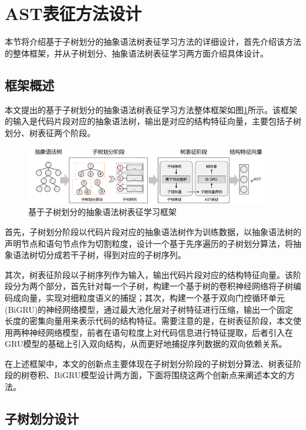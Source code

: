\section{AST表征方法设计}
\label{sec:AST}
本节将介绍基于子树划分的抽象语法树表征学习方法的详细设计，首先介绍该方法的整体框架，并从子树划分、抽象语法树表征学习两方面介绍具体设计。 

\subsection{框架概述}
\label{subsec:ASTOverview}
本文提出的基于子树划分的抽象语法树表征学习方法整体框架如图\ref{fig:astframework}所示。该框架的输入是代码片段对应的抽象语法树，输出是对应的结构特征向量，主要包括子树划分、树表征两个阶段。

\begin{figure}[H]
  \centering
  \includegraphics[width=0.95\textwidth]{figures/astframework.png}
  \caption{基于子树划分的抽象语法树表征学习框架}\label{fig:astframework}
\end{figure}

首先，子树划分阶段以代码片段对应的抽象语法树作为训练数据，以抽象语法树的声明节点和语句节点作为切割粒度，设计一个基于先序遍历的子树划分算法，将抽象语法树切分成若干子树，得到对应的子树序列。

其次，树表征阶段以子树序列作为输入，输出代码片段对应的结构特征向量。该阶段分为两个部分，首先针对每一个子树，构建一个基于树的卷积神经网络将子树编码成向量，实现对细粒度语义的捕捉；其次，构建一个基于双向门控循环单元(BiGRU)的神经网络模型，通过最大池化层对子树特征进行压缩，输出一个固定长度的密集向量用来表示代码的结构特征。需要注意的是，在树表征阶段，本文使用两种神经网络模型，前者在语句粒度上对代码信息进行特征提取，后者引入在GRU模型的基础上引入双向结构，从而更好地捕捉序列数据的双向依赖关系。

在上述框架中，本文的创新点主要体现在子树划分阶段的子树划分算法、树表征阶段的树卷积、BiGRU模型设计两方面，下面将围绕这两个创新点来阐述本文的方法。

\subsection{子树划分设计}
\label{subsec:ASTPreModel}

